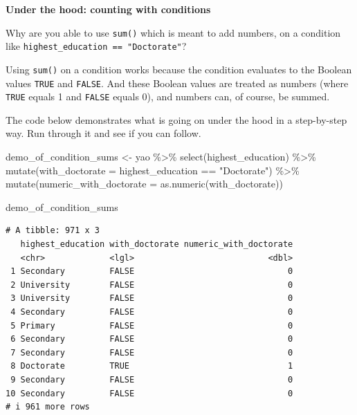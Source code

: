 \documentclass[
  letterpaper,
  DIV=11,
  numbers=noendperiod]{scrreprt}
\newenvironment{Shaded}{\begin{snugshade}}{\end{snugshade}}
\newcommand{\AttributeTok}[1]{\textcolor[rgb]{0.40,0.45,0.13}{#1}}
\newcommand{\FunctionTok}[1]{\textcolor[rgb]{0.28,0.35,0.67}{#1}}
\newcommand{\NormalTok}[1]{\textcolor[rgb]{0.00,0.23,0.31}{#1}}
\newcommand{\OtherTok}[1]{\textcolor[rgb]{0.00,0.23,0.31}{#1}}
\newcommand{\SpecialCharTok}[1]{\textcolor[rgb]{0.37,0.37,0.37}{#1}}
\newcommand{\StringTok}[1]{\textcolor[rgb]{0.13,0.47,0.30}{#1}}
\begin{document}
\begin{tcolorbox}[enhanced jigsaw, title=\textcolor{quarto-callout-note-color}{\faInfo}\hspace{0.5em}{Challenge}, colbacktitle=quarto-callout-note-color!10!white, leftrule=.75mm, arc=.35mm, opacityback=0, bottomrule=.15mm, rightrule=.15mm, toptitle=1mm, breakable, toprule=.15mm, colback=white, coltitle=black, colframe=quarto-callout-note-color-frame, bottomtitle=1mm, titlerule=0mm, left=2mm, opacitybacktitle=0.6]

\textbf{Under the hood: counting with conditions}

Why are you able to use \texttt{sum()} which is meant to add numbers, on
a condition like \texttt{highest\_education\ ==\ "Doctorate"}?

Using \texttt{sum()} on a condition works because the condition
evaluates to the Boolean values \texttt{TRUE} and \texttt{FALSE}. And
these Boolean values are treated as numbers (where \texttt{TRUE} equals
1 and \texttt{FALSE} equals 0), and numbers can, of course, be summed.

The code below demonstrates what is going on under the hood in a
step-by-step way. Run through it and see if you can follow.

\begin{Shaded}
\begin{Highlighting}[]
\NormalTok{demo\_of\_condition\_sums }\OtherTok{\textless{}{-}}\NormalTok{ yao }\SpecialCharTok{\%\textgreater{}\%} 
  \FunctionTok{select}\NormalTok{(highest\_education) }\SpecialCharTok{\%\textgreater{}\%} 
  \FunctionTok{mutate}\NormalTok{(}\AttributeTok{with\_doctorate =}\NormalTok{ highest\_education }\SpecialCharTok{==} \StringTok{"Doctorate"}\NormalTok{) }\SpecialCharTok{\%\textgreater{}\%} 
  \FunctionTok{mutate}\NormalTok{(}\AttributeTok{numeric\_with\_doctorate =} \FunctionTok{as.numeric}\NormalTok{(with\_doctorate))}

\NormalTok{demo\_of\_condition\_sums}
\end{Highlighting}
\end{Shaded}

\begin{verbatim}
# A tibble: 971 x 3
   highest_education with_doctorate numeric_with_doctorate
   <chr>             <lgl>                           <dbl>
 1 Secondary         FALSE                               0
 2 University        FALSE                               0
 3 University        FALSE                               0
 4 Secondary         FALSE                               0
 5 Primary           FALSE                               0
 6 Secondary         FALSE                               0
 7 Secondary         FALSE                               0
 8 Doctorate         TRUE                                1
 9 Secondary         FALSE                               0
10 Secondary         FALSE                               0
# i 961 more rows
\end{verbatim}


\end{tcolorbox}
\end{document}
